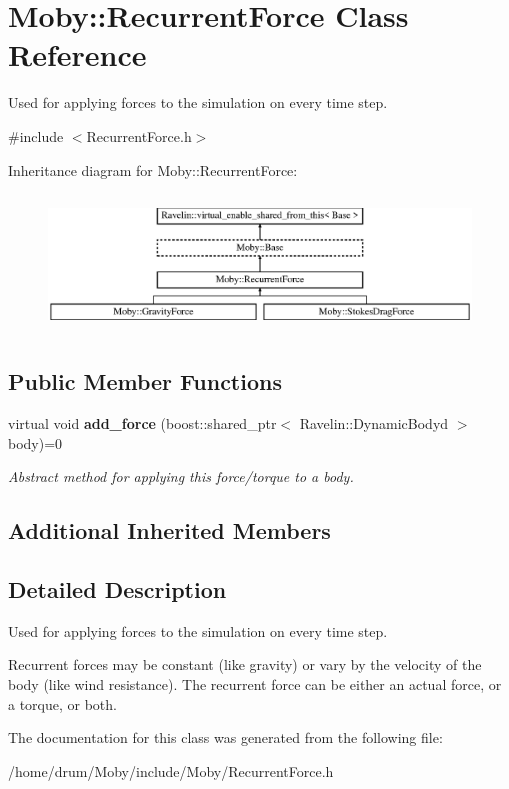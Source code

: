 \section{Moby\-:\-:Recurrent\-Force Class Reference}
\label{classMoby_1_1RecurrentForce}


Used for applying forces to the simulation on every time step.  




{\ttfamily \#include $<$Recurrent\-Force.\-h$>$}

Inheritance diagram for Moby\-:\-:Recurrent\-Force\-:\begin{figure}[H]
\begin{center}
\leavevmode
\includegraphics[height=3.684211cm]{classMoby_1_1RecurrentForce}
\end{center}
\end{figure}
\subsection*{Public Member Functions}
\begin{DoxyCompactItemize}
\item 
virtual void {\bf add\-\_\-force} (boost\-::shared\-\_\-ptr$<$ Ravelin\-::\-Dynamic\-Bodyd $>$ body)=0\label{classMoby_1_1RecurrentForce_a51481753177921d9896e3bfa04c24724}

\begin{DoxyCompactList}\small\item\em Abstract method for applying this force/torque to a body. \end{DoxyCompactList}\end{DoxyCompactItemize}
\subsection*{Additional Inherited Members}


\subsection{Detailed Description}
Used for applying forces to the simulation on every time step. 

Recurrent forces may be constant (like gravity) or vary by the velocity of the body (like wind resistance). The recurrent force can be either an actual force, or a torque, or both. 

The documentation for this class was generated from the following file\-:\begin{DoxyCompactItemize}
\item 
/home/drum/\-Moby/include/\-Moby/Recurrent\-Force.\-h\end{DoxyCompactItemize}
